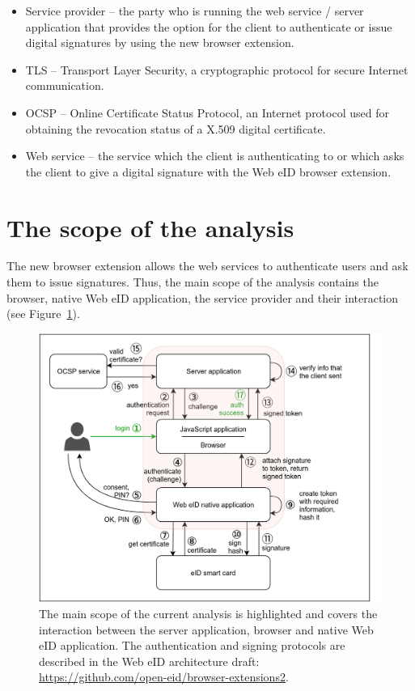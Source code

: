 \begin{itemize}
\item Service provider -- the party who is running the web service / server application that provides the option for the client to authenticate or issue digital signatures by using the new browser extension.

\item TLS -- Transport Layer Security, a cryptographic protocol for secure Internet communication.

\item OCSP -- Online Certificate Status Protocol, an Internet protocol used for obtaining the revocation status of a X.509 digital certificate.

\item Web service -- the service which the client is authenticating to or which asks the client to give a digital signature with the Web eID browser extension.


\end{itemize}

\section{The scope of the analysis}
\label{sec:scope}
The new browser extension allows the web services to authenticate users and ask them to issue signatures. Thus, the main scope of the analysis contains the browser, native Web eID application, the service provider and their interaction (see Figure~\ref{fig:scope}).

\begin{figure}[ht]
\includegraphics[width=\columnwidth]{img/main_scope_1.png}
\caption{The main scope of the current analysis is highlighted and covers the interaction between the server application, browser and native Web eID application. The  authentication and signing protocols are described in the  Web eID architecture draft: \url{https://github.com/open-eid/browser-extensions2}.}
\label{fig:scope}
\end{figure}

